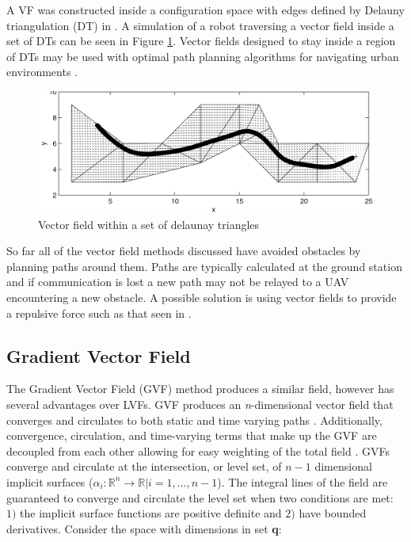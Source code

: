\documentclass[numbered,pdftex]{ohio-etd}
\begin{document}
A VF was constructed inside a configuration space with edges defined by Delauny triangulation (DT) in \cite{pimenta_fully_2007}.  A simulation of a robot traversing a vector field inside a set of DTs can be seen in Figure \ref{fig:cdtVF}. Vector fields designed to stay inside a region of DTs may be used with optimal path planning algorithms for navigating urban environments \cite{md_simplex_2017}.


\begin{figure}
	\centering
	\includegraphics[width=15cm]{PaperFigures/cdtVF}
	\caption{Vector field within a set of delaunay triangles \cite{pimenta_fully_2007}}
	\label{fig:cdtVF}
\end{figure}

So far all of the vector field methods discussed have avoided obstacles by planning paths around them. Paths are typically calculated at the ground station and if communication is lost a new path may not be relayed to a UAV encountering a new obstacle. A possible solution is using vector fields to provide a repulsive force such as that seen in \cite{panagou_motion_2014,zhou_vector_2014,wilhelm_2019}. 

\subsection{Gradient Vector Field}
The Gradient Vector Field (GVF) method produces a similar field, however has several advantages over LVFs. GVF produces an \textit{n}-dimensional vector field that converges and circulates to both static and time varying paths \cite{goncalves_artificial_2009}. Additionally, convergence, circulation, and time-varying terms that make up the GVF are decoupled from each other allowing for easy weighting of the total field \cite{goncalves_circulation_2010}. GVFs converge and circulate at the intersection, or level set, of $n-1$ dimensional implicit surfaces ($\alpha_i:\mathbb{R}^n\rightarrow\mathbb{R} | i=1,...,n-1$). The integral lines of the field are guaranteed to converge and circulate the level set when two conditions are met: $1)$ the implicit surface functions are positive definite and $2)$ have bounded derivatives. Consider the space with dimensions in set \textbf{q}:
\end{document}
